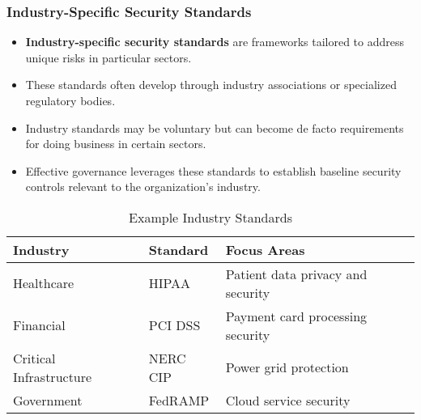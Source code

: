 \documentclass{beamer}
\begin{document}
\begin{frame}
\frametitle{Industry-Specific Security Standards}
\begin{itemize}
\item \textbf{Industry-specific security standards} are frameworks tailored to address unique risks in particular sectors.
\item These standards often develop through industry associations or specialized regulatory bodies.
\item Industry standards may be voluntary but can become de facto requirements for doing business in certain sectors.
\item Effective governance leverages these standards to establish baseline security controls relevant to the organization's industry.
\end{itemize}

\begin{table}
\scriptsize
\begin{tabular}{|p{2.5cm}|p{3cm}|p{4cm}|}
\hline
\textbf{Industry} & \textbf{Standard} & \textbf{Focus Areas} \\
\hline
Healthcare & HIPAA & Patient data privacy and security \\
\hline
Financial & PCI DSS & Payment card processing security \\
\hline
Critical Infrastructure & NERC CIP & Power grid protection \\
\hline
Government & FedRAMP & Cloud service security \\
\hline
\end{tabular}
\caption{Example Industry Standards}
\end{table}
\end{frame}
\end{document}

